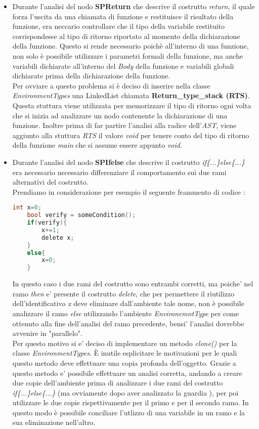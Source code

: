 \documentclass{article}
\begin{document}
\begin{itemize}
    \item Durante l'analisi del nodo \textbf{SPReturn} che descrive il costrutto \textit{return}, il quale forza l'uscita da una chiamata di funzione e restituisce il risultato della funzione, era neccario controllare che il tipo della variabile restituito corrispondesse al tipo di ritorno riportato al momento della dichiarazione della funzione. Questo si rende necessario poichè all'interno di una funzione, non solo è possibile utilizzare i parametri formali della funzione, ma anche variabili dichiarate all'interno del \textit{Body} della funzione e variabili globali dichiarate prima della dichiarazione della funzione. \\
    Per ovviare a questo problema si è deciso di inserire nella classe \textit{EnvironmentTypes} una LinkedList chiamata \textbf{Return\_type\_stack (RTS)}. Questa stuttura viene utilizzata per memorizzare il tipo di ritorno ogni volta che si inizia ad analizzare un nodo contenente la dichiarazione di una funzione. Inoltre prima di far partire l'analisi alla radice dell'\textit{AST}, viene aggiunto alla stuttura \textit{RTS} il valore \textit{void} per tenere conto del tipo di ritorno della funzione \textit{main} che si assume essere appunto \textit{void}.
    \item Durante l'analisi del nodo \textbf{SPIfelse} che descrive il costrutto \textit{if\{...\}else\{...\}} era necessario necessario differenziare il comportamento sui due rami alternativi del costrutto. \\
    Prendiamo in considerazione per esempio il seguente frammento di codice : \\
    \begin{lstlisting}[language=c]
    int x=0;
    bool verify = someCondition();
    if(verify){
        x+=1;
        delete x;
    }
    else{
        x=0;
    }
    \end{lstlisting}
    In questo caso i due rami del costrutto sono entrambi corretti, ma poiche' nel ramo \textit{then} e' presente il costrutto \textit{delete}, che per permettere il riutilizzo dell'identificativo \textit{x} deve eliminare dall'ambiente tale nome, non è possibile analizzare il ramo \textit{else} utilizzando l'ambiente \textit{EnvironemntType} per come ottenuto alla fine dell'analisi del ramo precedente, bensi' l'analisi dovrebbe avvenire in "parallelo". \\
    Per questo motivo si e' deciso di implementare un metodo \textit{clone()} per la classe \textit{EnvironmentTypes}. È inutile esplicitare le motivazioni per le quali questo metodo deve effettuare una copia profonda dell'oggetto. Grazie a questo metodo e' possibile effettuare un analisi corretta, andando a creare due copie dell'ambiente prima di analizzare i due rami del costrutto \textit{if\{...\}else\{...\}} (ma ovviamente dopo aver analizzato la guardia ), per poi utilizzare le due copie rispettivamente per il primo e per il secondo ramo. In questo modo è possibile conciliare l'utlizzo di una variabile in un ramo e la sua eliminazione nell'altro.\\

\end{itemize}
\end{document}
